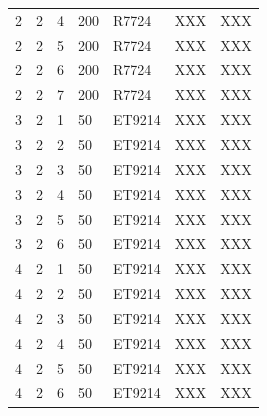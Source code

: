 \documentclass[3p,final,twocolumn]{elsarticle}
\begin{document}
\begin{table}[ht]
\begin{tabular}{  m{3em} | m{3em} | m{5em} | m{3em} | m{3em} | m{3em} | m{8em} }
2	&2	&4	&200	&R7724	&XXX	&XXX\\ 
2	&2	&5	&200	&R7724	&XXX	&XXX\\ 
2	&2	&6	&200	&R7724	&XXX	&XXX\\ 
2	&2	&7	&200	&R7724	&XXX	&XXX\\ 
3	&2	&1	&50	&ET9214	&XXX	&XXX\\ 
3	&2	&2	&50	&ET9214	&XXX	&XXX\\ 
3	&2	&3	&50	&ET9214	&XXX	&XXX\\ 
3	&2	&4	&50	&ET9214	&XXX	&XXX\\ 
3	&2	&5	&50	&ET9214	&XXX	&XXX\\ 
3	&2	&6	&50	&ET9214	&XXX	&XXX\\ 
4	&2	&1	&50	&ET9214	&XXX	&XXX\\ 
4	&2	&2	&50	&ET9214	&XXX	&XXX\\ 
4	&2	&3	&50	&ET9214	&XXX	&XXX\\ 
4	&2	&4	&50	&ET9214	&XXX	&XXX\\ 
4	&2	&5	&50	&ET9214	&XXX	&XXX\\ 
4	&2	&6	&50	&ET9214	&XXX	&XXX\\ 

		\hline
	\end{tabular}
\end{table}
\end{document}
